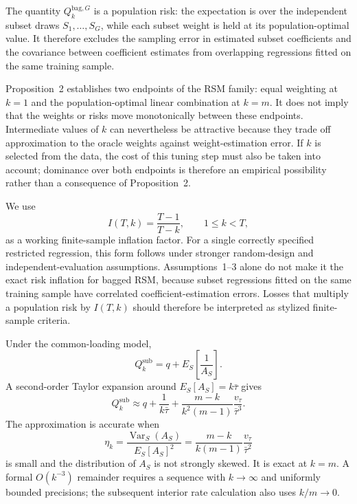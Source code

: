 
The quantity $Q_k^{\mathrm{bag},G}$ is a population risk: the expectation is
over the independent subset draws $S_1,\ldots,S_G$, while each subset weight
is held at its population-optimal value.  It therefore excludes the sampling
error in estimated subset coefficients and the covariance between coefficient
estimates from overlapping regressions fitted on the same training sample.

Proposition~2 establishes two endpoints of the RSM family: equal weighting at
$k=1$ and the population-optimal linear combination at $k=m$.  It does not
imply that the weights or risks move monotonically between these endpoints.
Intermediate values of $k$ can nevertheless be attractive because they trade
off approximation to the oracle weights against weight-estimation error.  If
$k$ is selected from the data, the cost of this tuning step must also be taken
into account; dominance over both endpoints is therefore an empirical
possibility rather than a consequence of Proposition~2.

We use
\[
  I(T,k)=\frac{T-1}{T-k},\qquad 1\leq k<T,
\]
as a working finite-sample inflation factor.  For a single correctly specified
restricted regression, this form follows under stronger random-design and
independent-evaluation assumptions.  Assumptions~1--3 alone do not make it the
exact risk inflation for bagged RSM, because subset regressions fitted on the
same training sample have correlated coefficient-estimation errors.  Losses
that multiply a population risk by $I(T,k)$ should therefore be interpreted as
stylized finite-sample criteria.

\begin{proposition}
Under the common-loading model,
\[
 Q_k^{\mathrm{sub}}=q+E_S\!\left[\frac{1}{A_S}\right].
\]
A second-order Taylor expansion around $E_S[A_S]=k\bar\tau$ gives
\[
 Q_k^{\mathrm{sub}}
 \approx q+\frac{1}{k\bar\tau}
 +\frac{m-k}{k^2(m-1)}\frac{v_\tau}{\bar\tau^3}.
\]
The approximation is accurate when
\[
 \eta_k=\frac{\operatorname{Var}_S(A_S)}{E_S[A_S]^2}
 =\frac{m-k}{k(m-1)}\frac{v_\tau}{\bar\tau^2}
\]
is small and the distribution of $A_S$ is not strongly skewed.  It is exact at
$k=m$.  A formal $O(k^{-3})$ remainder requires a sequence with $k\to\infty$
and uniformly bounded precisions; the subsequent interior rate calculation
also uses $k/m\to0$.
\end{proposition}

